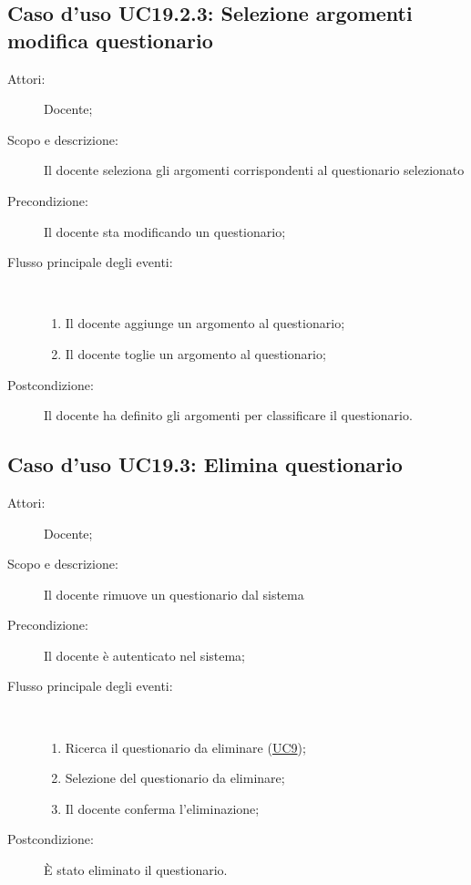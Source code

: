 \subsection{Caso d'uso UC19.2.3: Selezione argomenti modifica questionario}\begin{description}
\item[Attori:] Docente;
\item[Scopo e descrizione:] Il docente seleziona gli argomenti corrispondenti al questionario selezionato
      \item[Precondizione:] Il docente sta modificando un questionario;

        \item[Flusso principale degli eventi:] \ 
 \begin{enumerate}
          \item Il docente aggiunge un argomento al questionario;
          \item Il docente toglie un argomento al questionario;

      \end{enumerate}
    \item[Postcondizione:] Il docente ha definito gli argomenti per classificare il questionario.
  \end{description}
\hypertarget{UC19.3}{}
\subsection{Caso d'uso UC19.3: Elimina questionario}\begin{description}
\item[Attori:] Docente;
\item[Scopo e descrizione:] Il docente rimuove un questionario dal sistema
      \item[Precondizione:] Il docente è autenticato nel sistema;

        \item[Flusso principale degli eventi:] \ 
 \begin{enumerate}
          \item Ricerca il questionario da eliminare (\hyperlink{UC9}{UC9});
          \item Selezione del questionario da eliminare;
          \item Il docente conferma l'eliminazione;

      \end{enumerate}
    \item[Postcondizione:] È stato eliminato il questionario.
  \end{description}
\hypertarget{UC19.4}{}
